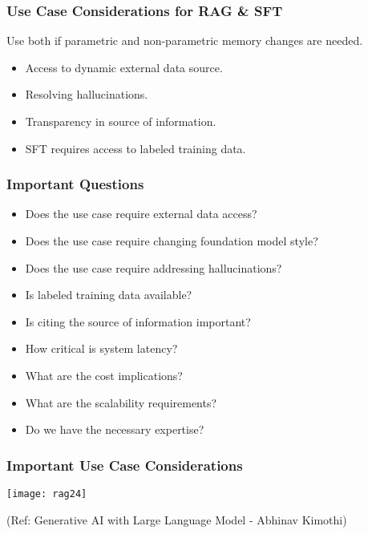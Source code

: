\begin{frame}[fragile]\frametitle{Use Case Considerations for RAG \& SFT}
Use both if parametric and non-parametric memory changes are needed.

\begin{itemize}
  \item Access to dynamic external data source.
  \item Resolving hallucinations.
  \item Transparency in source of information.
  \item SFT requires access to labeled training data.
\end{itemize}
\end{frame}

\begin{frame}[fragile]\frametitle{Important Questions}
\begin{itemize}
  \item Does the use case require external data access?
  \item Does the use case require changing foundation model style?
  \item Does the use case require addressing hallucinations?
  \item Is labeled training data available?
  \item Is citing the source of information important?
  \item How critical is system latency?
  \item What are the cost implications?
  \item What are the scalability requirements?
  \item Do we have the necessary expertise?
\end{itemize}
\end{frame}

\begin{frame}[fragile]\frametitle{Important Use Case Considerations}


		\begin{center}
		\texttt{[image: rag24]}
		\end{center}

{\tiny (Ref: Generative AI with Large Language Model - Abhinav  Kimothi)}

\end{frame}


